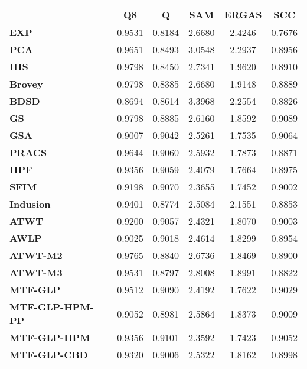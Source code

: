 \begin{tabular}{|l|c|c|c|c|c|}
\hline
&\textbf{Q8}&\textbf{Q}&\textbf{SAM}&\textbf{ERGAS}&\textbf{SCC}\\\hline
\textbf{EXP}&0.9531&0.8184&2.6680&2.4246&0.7676\\\hline
\textbf{PCA}&0.9651&0.8493&3.0548&2.2937&0.8956\\\hline
\textbf{IHS}&0.9798&0.8450&2.7341&1.9620&0.8910\\\hline
\textbf{Brovey}&0.9798&0.8385&2.6680&1.9148&0.8889\\\hline
\textbf{BDSD}&0.8694&0.8614&3.3968&2.2554&0.8826\\\hline
\textbf{GS}&0.9798&0.8885&2.6160&1.8592&0.9089\\\hline
\textbf{GSA}&0.9007&0.9042&2.5261&1.7535&0.9064\\\hline
\textbf{PRACS}&0.9644&0.9060&2.5932&1.7873&0.8871\\\hline
\textbf{HPF}&0.9356&0.9059&2.4079&1.7664&0.8975\\\hline
\textbf{SFIM}&0.9198&0.9070&2.3655&1.7452&0.9002\\\hline
\textbf{Indusion}&0.9401&0.8774&2.5084&2.1551&0.8853\\\hline
\textbf{ATWT}&0.9200&0.9057&2.4321&1.8070&0.9003\\\hline
\textbf{AWLP}&0.9025&0.9018&2.4614&1.8299&0.8954\\\hline
\textbf{ATWT-M2}&0.9765&0.8840&2.6736&1.8469&0.8900\\\hline
\textbf{ATWT-M3}&0.9531&0.8797&2.8008&1.8991&0.8822\\\hline
\textbf{MTF-GLP}&0.9512&0.9090&2.4192&1.7622&0.9029\\\hline
\textbf{MTF-GLP-HPM-PP}&0.9052&0.8981&2.5864&1.8373&0.9009\\\hline
\textbf{MTF-GLP-HPM}&0.9356&0.9101&2.3592&1.7423&0.9052\\\hline
\textbf{MTF-GLP-CBD}&0.9320&0.9006&2.5322&1.8162&0.8998\\\hline
\end{tabular}
